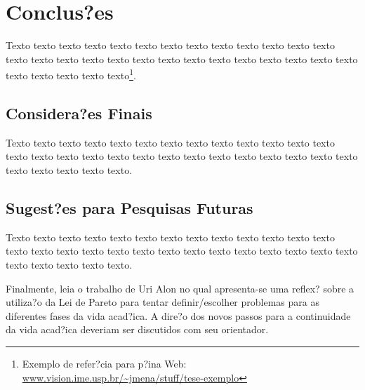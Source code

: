 \chapter{Conclus?es}
\label{cap:conclusoes}

Texto texto texto texto texto texto texto texto texto texto texto texto texto
texto texto texto texto texto texto texto texto texto texto texto texto texto
texto texto texto texto texto texto\footnote{Exemplo de refer?cia para p?ina
Web: \url{www.vision.ime.usp.br/~jmena/stuff/tese-exemplo}}.

\section{Considera?es Finais} 

Texto texto texto texto texto texto texto texto texto texto texto texto texto
texto texto texto texto texto texto texto texto texto texto texto texto texto
texto texto texto texto texto texto. 

\section{Sugest?es para Pesquisas Futuras} 

Texto texto texto texto texto texto texto texto texto texto texto texto texto
texto texto texto texto texto texto texto texto texto texto texto texto texto
texto texto texto texto texto texto.

Finalmente, leia o trabalho de Uri Alon \cite{alon09:how} no qual apresenta-se
uma reflex? sobre a utiliza?o da Lei de Pareto para tentar definir/escolher
problemas para as diferentes fases da vida acad?ica.  A dire?o dos novos
passos para a continuidade da vida acad?ica deveriam ser discutidos com seu
orientador.
